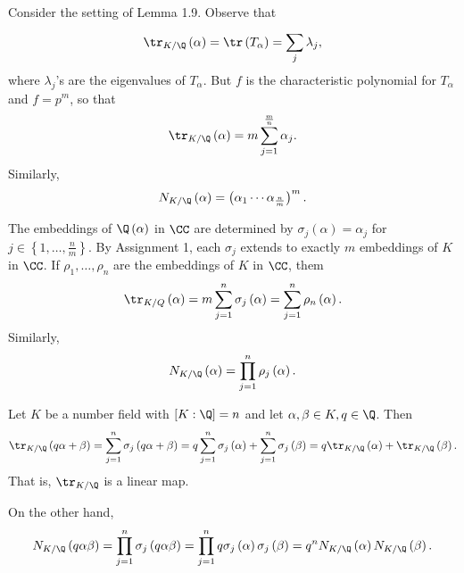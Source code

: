 \documentclass[pmath441]{subfiles}
\begin{document}
    \np Consider the setting of Lemma 1.9. Observe that
    \begin{equation*}
        \tr_{K /\Q}\left( \alpha \right) = \tr\left( T_{\alpha} \right) = \sum^{}_{j} \lambda_j,
    \end{equation*}
    where $\lambda_j$'s are the eigenvalues of $T_{\alpha}$. But $f$ is the characteristic polynomial for $T_{\alpha}$ and $f=p^m$, so that
    \begin{equation*}
        \tr_{K /\Q}\left( \alpha \right) = m\sum^{\frac{m}{n}}_{j=1}\alpha_j.
    \end{equation*}
    Similarly,
    \begin{equation*}
        N_{K /\Q}\left( \alpha \right) = \left( \alpha_1\cdots\alpha_{\frac{n}{m}} \right)^m.
    \end{equation*}
    
    \np The embeddings of $\Q\left( \alpha \right)$ in $\CC$ are determined by $\sigma_j\left( \alpha \right)=\alpha_j$ for $j\in\left\lbrace 1,\ldots,\frac{n}{m} \right\rbrace$. By Assignment 1, each $\sigma_j$ extends to exactly $m$ embeddings of $K$ in $\CC$. If $\rho_1,\ldots,\rho_n$ are the embeddings of $K$ in $\CC$, them
    \begin{equation*}
        \tr_{K /Q}\left( \alpha \right) = m\sum^{n}_{j=1} \sigma_j\left( \alpha \right) = \sum^{n}_{j=1}\rho_n\left( \alpha \right).
    \end{equation*}
    Similarly,
    \begin{equation*}
        N_{K /\Q}\left( \alpha \right) = \prod^{n}_{j=1} \rho_j\left( \alpha \right).
    \end{equation*}
    
    \clearpage

    \np Let $K$ be a number field with $\left[ K:\Q \right]=n$ and let $\alpha,\beta\in K, q\in\Q$. Then
    \begin{equation*}
        \tr_{K /\Q}\left( q\alpha+\beta \right) = \sum^{n}_{j=1}\sigma_j\left( q\alpha+\beta \right) = q\sum^{n}_{j=1}\sigma_j\left( \alpha \right) + \sum^{n}_{j=1}\sigma_j\left( \beta \right) = q\tr_{K /\Q}\left( \alpha \right) + \tr_{K /\Q}\left( \beta \right).
    \end{equation*}
    That is, $\tr_{K /\Q}$ is a linear map.

    On the other hand,
    \begin{equation*}
        N_{K /\Q}\left( q\alpha\beta \right) = \prod^{n}_{j=1} \sigma_j\left( q\alpha\beta \right) = \prod^{n}_{j=1} q\sigma_j\left( \alpha \right)\sigma_j\left( \beta \right) = q^nN_{K /\Q}\left( \alpha \right)N_{K /\Q}\left( \beta \right).
    \end{equation*}
    
\end{document}
